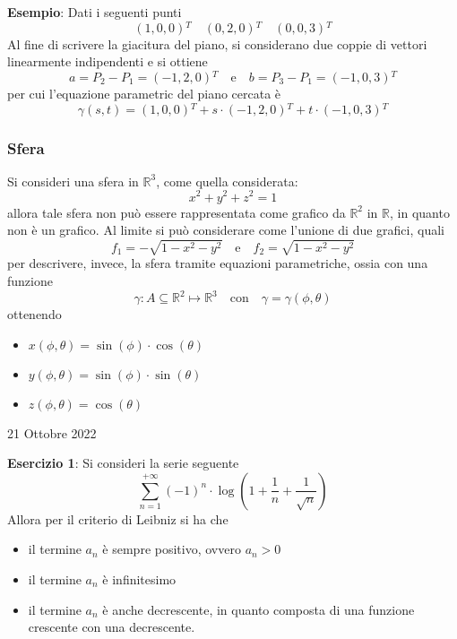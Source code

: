 \documentclass[a4paper]{extarticle}
\begin{document}
\vspace{1em}
\noindent
\textbf{Esempio}: Dati i seguenti punti
\[(1,0,0){^T} \hspace{1em} (0,2,0){^T} \hspace{1em} (0,0,3){^T}\]
Al fine di scrivere la giacitura del piano, si considerano due coppie di vettori linearmente indipendenti e si ottiene
\[a=P_2-P_1=(-1,2,0){^T} \hspace{1em} \text{e} \hspace{1em} b=P_3-P_1=(-1,0,3){^T}\]
per cui l'equazione parametric del piano cercata è
\[\gamma(s,t)=(1,0,0){^T} + s \cdot (-1,2,0){^T} + t \cdot (-1,0,3){^T}\]

\vspace{1em}
\noindent
\subsubsection{Sfera}
Si consideri una sfera in $\mathbb{R}^3$, come quella considerata:
\[x^2+y^2+z^2=1\]
allora tale sfera non può essere rappresentata come grafico da $\mathbb{R}^2$ in $\mathbb{R}$, in quanto non è un grafico. Al limite si può considerare come l'unione di due grafici, quali
\[f_1=-\sqrt{1-x^2-y^2} \hspace{1em} \text{e} \hspace{1em} f_2=\sqrt{1-x^2-y^2}\]
per descrivere, invece, la sfera tramite equazioni parametriche, ossia con una funzione
\[\gamma : A \subseteq \mathbb{R}^2 \longmapsto \mathbb{R}^3 \hspace{1em} \text{con} \hspace{1em} \gamma=\gamma(\phi,\theta)\]
ottenendo
\begin{itemize}
    \item $x(\phi,\theta)=\sin(\phi) \cdot \cos(\theta)$
    \item $y(\phi,\theta)=\sin(\phi) \cdot \sin(\theta)$
    \item $z(\phi,\theta)=\cos(\theta)$
\end{itemize}

\newpage
\noindent
\begin{center}
    21 Ottobre 2022
\end{center}

\vspace{1em}
\noindent
\textbf{Esercizio 1}: Si consideri la serie seguente
\[\sum_{n=1}^{+\infty} (-1)^n \cdot \log \left(1+\frac{1}{n}+\frac{1}{\sqrt{n}}\right)\]
Allora per il criterio di Leibniz si ha che
\begin{itemize}
    \item il termine $a_n$ è sempre positivo, ovvero $a_n>0$
    \item il termine $a_n$ è infinitesimo
    \item il termine $a_n$ è anche decrescente, in quanto composta di una funzione crescente con una decrescente.
\end{itemize}
\end{document}
